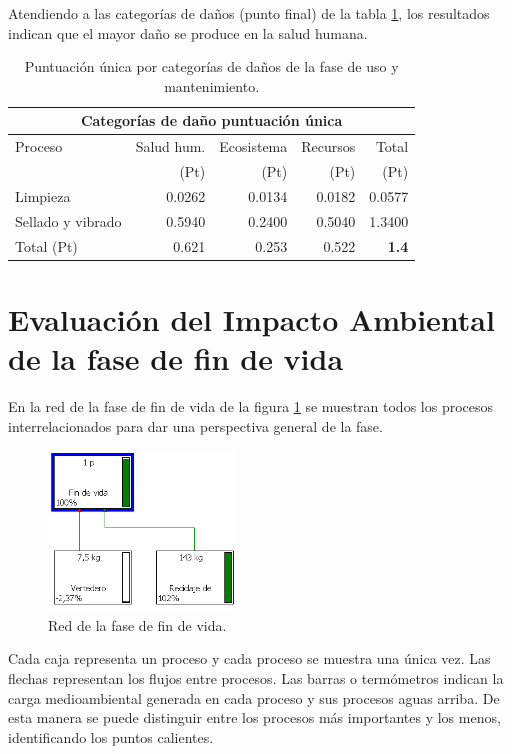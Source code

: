 Atendiendo a las categorías de daños (punto final) de la tabla \ref{categoriasdanosuso}, los resultados indican que el mayor daño se produce en la salud humana.

\begin{table}[!htb]
\centering
\begin{tabular}{p{6cm}rrrr}
\toprule
\multicolumn{5}{c}{Categorías de daño puntuación única}\\
\midrule
Proceso & Salud hum. & Ecosistema & Recursos & Total\\
 & (Pt) & (Pt) &  (Pt) & (Pt)\\
\midrule
Limpieza & 0.0262 & 0.0134 & 0.0182 & 0.0577\\
Sellado y vibrado & 0.5940 & 0.2400 & 0.5040 & 1.3400\\
\midrule
Total (Pt) & 0.621 & 0.253 & 0.522 & \textbf{1.4}\\
\bottomrule
\end{tabular}
\caption{Puntuación única por categorías de daños de la fase de uso y mantenimiento.}
\label{categoriasdanosuso}
\end{table}

\section{Evaluación del Impacto Ambiental de la fase de fin de vida}

En la red de la fase de fin de vida de la figura \ref{fig:fdv_red} se muestran todos los procesos interrelacionados para dar una perspectiva general de la fase.

\begin{figure}[!htb]
\centering
\includegraphics[width=5cm]{img/fdv_red.png}
\caption{Red de la fase de fin de vida.}
\label{fig:fdv_red}
\end{figure}

Cada caja representa un proceso y cada proceso se muestra una única vez. Las flechas representan los flujos entre procesos. Las barras o termómetros indican la carga medioambiental generada en cada proceso y sus procesos aguas arriba. De esta manera se puede distinguir entre los procesos más importantes y los menos, identificando los puntos calientes.

